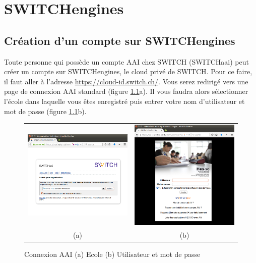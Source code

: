 \chapter{SWITCHengines}
\section{Création d'un compte sur SWITCHengines}

Toute personne qui possède un compte AAI chez SWITCH (SWITCHaai) peut créer un compte sur SWITCHengines, le cloud privé de SWITCH. Pour ce faire, il faut aller à l'adresse \url{https://cloud-id.switch.ch/}. Vous serez redirigé vers une page de connexion AAI standard (figure \ref{loginAAI}a). Il vous faudra alors sélectionner l'école dans laquelle vous êtes enregistré puis entrer votre nom d'utilisateur et mot de passe (figure \ref{loginAAI}b).

\begin{figure}[h!]
    \centering
    \begin{tabular}{cc}
      \includegraphics[width=.48\linewidth]{img/switch1.png} &
      \includegraphics[width=.48\linewidth]{img/switch2.png} \\
      (a) & (b)\\
    \end{tabular}
    \caption{Connexion AAI (a) Ecole (b) Utilisateur et mot de passe
    \label{loginAAI}}
\end{figure}

